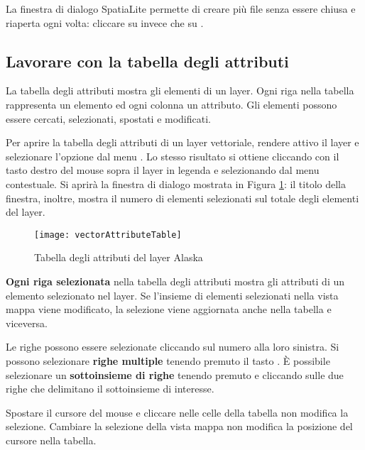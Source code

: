 La finestra di dialogo SpatiaLite permette di creare più file senza essere chiusa e 
riaperta ogni volta: cliccare su  invece che su .

\subsection{Lavorare con la tabella degli attributi}
\label{sec:attribute table}

La tabella degli attributi mostra gli elementi di un layer. Ogni riga
nella tabella rappresenta un elemento ed ogni colonna un attributo.
Gli elementi possono essere cercati, selezionati, spostati e modificati.

Per aprire la tabella degli attributi di un layer vettoriale, rendere attivo il layer e 
selezionare l'opzione 
dal menu . Lo stesso risultato si ottiene cliccando con il
tasto destro del mouse sopra il layer in legenda e selezionando  
dal menu contestuale. 
Si aprirà la finestra di dialogo mostrata in Figura \ref{fig:attributetable}: il titolo della finestra, inoltre, 
mostra il numero di elementi selezionati sul totale degli elementi del layer.

\begin{figure}[ht]
   \centering
   \texttt{[image: vectorAttributeTable]}
   \caption{Tabella degli attributi del layer Alaska \nixcaption}\label{fig:attributetable}
\end{figure}


\textbf{Ogni riga selezionata} nella tabella degli attributi mostra gli attributi di un elemento
selezionato nel layer. Se l'insieme di elementi selezionati nella vista mappa viene modificato, 
la selezione viene aggiornata anche nella tabella e viceversa. 

Le righe possono essere selezionate cliccando sul numero alla loro sinistra.
Si possono selezionare \textbf{righe multiple} tenendo premuto il tasto .
È possibile selezionare un \textbf{sottoinsieme di righe} tenendo premuto  
e cliccando sulle due righe che delimitano il sottoinsieme di interesse.

Spostare il cursore del mouse e cliccare nelle celle della tabella non modifica la selezione. 
Cambiare la selezione della vista mappa non modifica la posizione del cursore nella tabella.


